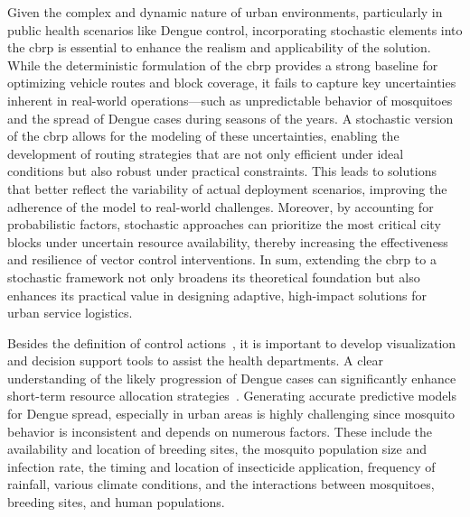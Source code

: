 Given the complex and dynamic nature of urban environments, particularly in public health scenarios like Dengue control, incorporating stochastic elements into the \gls{cbrp} is essential to enhance the realism and applicability of the solution. While the deterministic formulation of the \gls{cbrp} provides a strong baseline for optimizing vehicle routes and block coverage, it fails to capture key uncertainties inherent in real-world operations—such as unpredictable behavior of mosquitoes and the spread of Dengue cases during seasons of the years. 
A stochastic version of the \gls{cbrp} allows for the modeling of these uncertainties, enabling the development of routing strategies that are not only efficient under ideal conditions but also robust under practical constraints. This leads to solutions that better reflect the variability of actual deployment scenarios, improving the adherence of the model to real-world challenges. Moreover, by accounting for probabilistic factors, stochastic approaches can prioritize the most critical city blocks under uncertain resource availability, thereby increasing the effectiveness and resilience of vector control interventions. In sum, extending the \gls{cbrp}  to a stochastic framework not only broadens its theoretical foundation but also enhances its practical value in designing adaptive, high-impact solutions for urban service logistics.

Besides the definition of control actions~\citep{gomez-2009,jing2019dengue}, it is important to develop visualization and decision support tools to assist the health departments. A clear understanding of the likely progression of Dengue cases can significantly enhance short-term resource allocation strategies~\citep{brasil-dept-helth:2009}. Generating accurate predictive models for Dengue spread, especially in urban areas is highly challenging since mosquito behavior is inconsistent and depends on numerous factors. These include the availability and location of breeding sites, the mosquito population size and infection rate, the timing and location of insecticide application, frequency of rainfall, various climate conditions, and the interactions between mosquitoes, breeding sites, and human populations.

